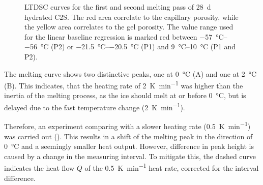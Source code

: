 \begin{figure}[!htb]

    \caption{
		\ac{LTDSC} curves for the first and second melting pass of \qty{28}{\day} hydrated \ac{C2S}.
		The red area correlate to the capillary porosity, while the yellow area correlates to the gel porosity.
		The value range used for the linear baseline regression is marked red between \qtyrange{-57}{-56}{\celsius} (P2) or \qtyrange{-21.5}{-20.5}{\celsius} (P1) and \qtyrange{9}{10}{\celsius} (P1 and P2).
	}
    \label{fig:ltdsc_result_c2s_melt}
\end{figure}



The melting curve shows two distinctive peaks, one at \qty{0}{\celsius} (A) and one at \qty{2}{\celsius} (B).
This indicates, that the heating rate of \qty{2}{\kelvin\per\minute} was higher than the inertia of the melting process, as the ice should melt at or before \qty{0}{\celsius}, but is delayed due to the fast temperature change (\qty{2}{\kelvin\per\minute}).

Therefore, an experiment comparing with a slower heating rate (\qty{0.5}{\kelvin\per\minute}) was carried out ().
This results in a shift of the melting peak in the direction of \qty{0}{\celsius} and a seemingly smaller heat output.
However, difference in peak height is caused by a change in the measuring interval.
To mitigate this, the dashed curve indicates the heat flow $\dot{Q}$ of the \qty{0.5}{\kelvin\per\minute} heat rate, corrected for the interval difference. %

